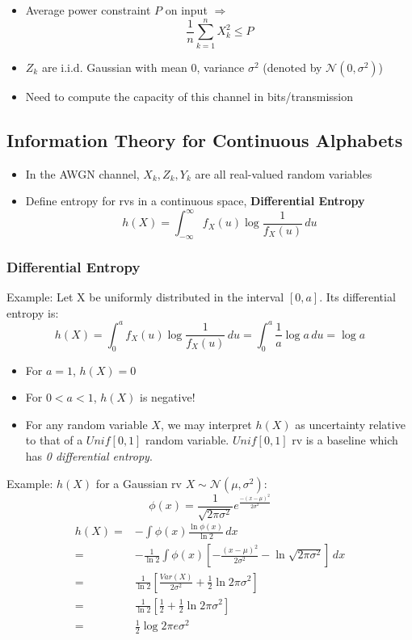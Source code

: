 \documentclass[12pt]{article}
\newcommand{\intinf}{\int_{-\infty}^{\infty}}
\newcommand{\sigd}{\sigma^2}
\begin{document}
\begin{itemize}
    \item Average power constraint \textcolor{blue1}{$P$} on input $\Rightarrow$
    \[
    \frac{1}{n}\sum_{k=1}^n X_k^2 \le P
    \]
    \item $Z_k$ are i.i.d. Gaussian with mean 0, variance $\sigma^2$ (denoted by $\mathcal{N}(0,\sigma^2)$)
    \item Need to compute the capacity of this channel in bits/transmission
\end{itemize}
\subsection{Information Theory for Continuous Alphabets}
\begin{itemize}
    \item In the AWGN channel, $X_k,Z_k,Y_k$ are all real-valued random variables
    \item Define entropy for rvs in a continuous space, \textbf{Differential Entropy}
    \[
    h(X) = \intinf f_X(u)\log \frac{1}{f_X(u)}\, du
    \]
\end{itemize}
\subsubsection{Differential Entropy}
Example: Let X be uniformly distributed in the interval $[0,a]$. Its differential entropy is:
\[
h(X) = \int_0^a f_X(u)\log \frac{1}{f_X(u)}\, du = \int_0^a \frac{1}{a}\log a \, du = \log a
\]
\begin{itemize}
    \item For $a=1$, $h(X) = 0$
    \item For $0<a<1$, $h(X)$ is negative!
    \item For any random variable $X$, we may interpret $h(X)$ as uncertainty relative to that of a $Unif[0,1]$ random variable.  $Unif[0,1]$ rv is a baseline which has \textit{0 differential entropy}.
\end{itemize}
Example: $h(X)$ for a Gaussian rv $X\sim \mathcal{N}(\mu,\sigd)$:
\[
\phi(x) = \frac{1}{\sqrt{2\pi\sigd}}e^{\frac{-(x-\mu)^2}{2\sigd}}
\]
\begin{align*}
    h(X) =& -\int \phi(x)\frac{\ln\phi(x)}{\ln 2} \, dx\\
    =& - \frac{1}{\ln 2} \int \phi(x)\left[-\frac{(x-\mu)^2}{2\sigd}-\ln\sqrt{2\pi\sigd} \right]\, dx \\
    =&\frac{1}{\ln 2} \left[\frac{Var(X)}{2\sigd} + \frac{1}{2} \ln 2\pi\sigd \right] \\
    =& \frac{1}{\ln 2}\left[ \frac{1}{2} + \frac{1}{2}\ln 2\pi\sigd  \right]\\
    =& \frac{1}{2}\log 2\pi e \sigd
\end{align*}
\end{document}

